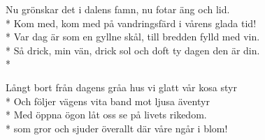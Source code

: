 \begin{SongText}
    \begin{SongVerse}
        Nu grönskar det i dalens famn, nu fotar äng och lid.\\*%
        Kom med, kom med på vandringsfärd i vårens glada tid!\\*%
        Var dag är som en gyllne skål, till bredden fylld med vin.\\*%
        Så drick, min vän, drick sol och doft ty dagen den är din.\\*%
    \end{SongVerse}
    \begin{SongVerse}
        Långt bort från dagens gråa hus vi glatt vår kosa styr\\*%
        Och följer vägens vita band mot ljusa äventyr\\*%
        Med öppna ögon låt oss se på livets rikedom.\\*%
        som gror och sjuder överallt där våre ngår i blom!
    \end{SongVerse}
\end{SongText}